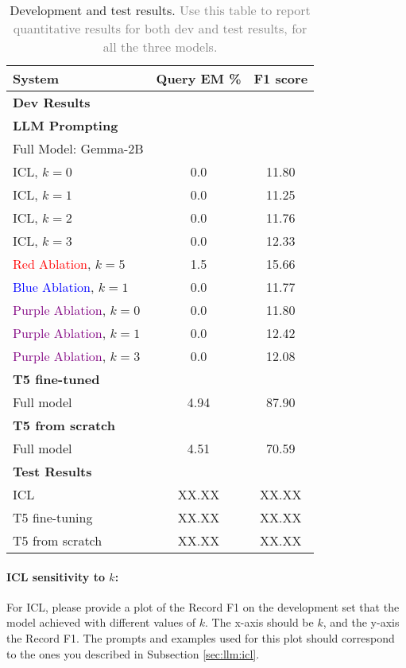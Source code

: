 \documentclass{article}
\begin{document}
\begin{table}[h!]
\centering
\begin{tabular}{lcc}
  \toprule
  System & Query EM \% & F1 score\\
  \midrule
  \multicolumn{3}{l}{\textbf{Dev Results}} \\
  \midrule
  \multicolumn{3}{l}{\textbf{LLM Prompting}} \\
	Full Model: Gemma-2B &  &  \\ 
	ICL, $k=0$ & 0.0 & 11.80 \\
	ICL, $k=1$ & 0.0 & 11.25 \\
	ICL, $k=2$ & 0.0 & 11.76 \\
	ICL, $k=3$ & 0.0 & 12.33 \\
	\textcolor{Red}{Red Ablation}, $k=5$ & 1.5 & 15.66 \\
	\textcolor{Blue}{Blue Ablation}, $k=1$ & 0.0 & 11.77 \\
	\textcolor{Purple}{Purple Ablation}, $k=0$ & 0.0 & 11.80 \\
	\textcolor{Purple}{Purple Ablation}, $k=1$ & 0.0 & 12.42 \\
	\textcolor{Purple}{Purple Ablation}, $k=3$ & 0.0 & 12.08 \\
	
  \multicolumn{3}{l}{\textbf{T5 fine-tuned}} \\
  Full model & 4.94 & 87.90 \\[5pt]

  \multicolumn{3}{l}{\textbf{T5 from scratch}} \\
  Full model & 4.51 & 70.59 \\ 

  \midrule
  \multicolumn{3}{l}{\textbf{Test Results}} \\
  \midrule
  ICL & XX.XX & XX.XX \\ 
  T5 fine-tuning & XX.XX & XX.XX \\
  T5 from scratch & XX.XX & XX.XX \\
  \bottomrule
\end{tabular}  
\caption{Development and test results. \textcolor{gray}{Use this table to report quantitative results for both dev and test results, for all the three models.}}
\label{tab:results}
\end{table}


\paragraph{ICL sensitivity to $k$:} For ICL, please provide a plot of the Record F1 on the development set that the model achieved with different values of $k$. The x-axis should be $k$, and the y-axis the Record F1. The prompts and examples used for this plot should correspond to the ones you described in Subsection \ref{sec:llm:icl}.
\end{document}
